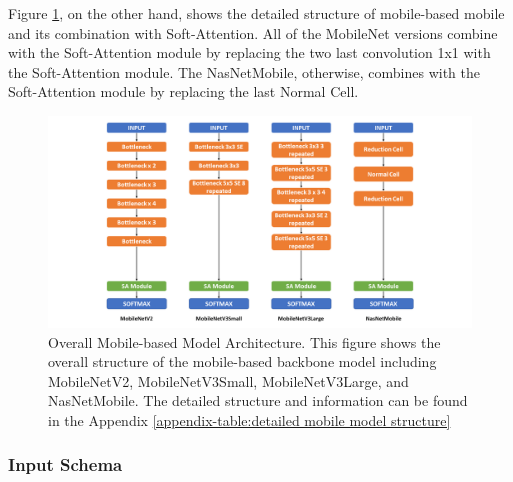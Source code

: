 \documentclass[sensors,article,submit,pdftex,moreauthors]{Definitions/mdpi}
\begin{document}
	Figure \ref{fig:mobile-model-structure}, on the other hand, shows the detailed structure of mobile-based mobile and its combination with Soft-Attention. All of the MobileNet versions combine with the Soft-Attention module by replacing the two last convolution 1x1 with the Soft-Attention module. The NasNetMobile, otherwise, combines with the Soft-Attention module by replacing the last Normal Cell. 
	\begin{figure}[H]
		\centering
		\includegraphics[width=1\linewidth]{Definitions/Mobile Model Structure}
		\caption{Overall Mobile-based Model Architecture. This figure shows the overall structure of the mobile-based backbone model including MobileNetV2, MobileNetV3Small, MobileNetV3Large, and NasNetMobile. The detailed structure and information can be found in the Appendix \ref{appendix-table:detailed mobile model structure}}
		\label{fig:mobile-model-structure}
	\end{figure}
	
	\subsubsection{Input Schema}
	
\end{document}
